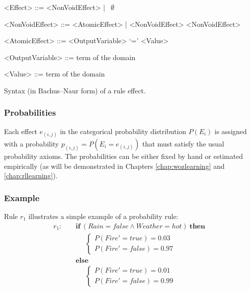 \begin{table}[h]
\vspace{3mm}
\begin{grammar}

<Effect> ::= <NonVoidEffect> | \ $\emptyset$

<NonVoidEffect> ::= <AtomicEffect> | <NonVoidEffect> \lit{$\land$} <NonVoidEffect> 

<AtomicEffect> ::= <OutputVariable> `=' <Value>

<OutputVariable> ::= term of the domain

<Value> ::= term  of the domain

\end{grammar}
\caption{Syntax (in Bachus--Naur form) of a rule effect.}
\label{table:syntaxeffects}
\end{table}

\subsubsection*{Probabilities}

Each effect $e_{(i,j)}$ in the categorical probability distribution $P(E_i)$ is assigned with a probability $p_{(i,j)} = P(E_i = e_{(i,j)})$ that must satisfy the usual probability axioms.  The probabilities can be either fixed by hand or estimated empirically (as will be demonstrated in Chapters \ref{chap:wozlearning} and \ref{chap:rllearning}).


\subsubsection*{Example}

Rule $r_1$ illustrates a simple example of a probability rule:
\begin{align*}
r_1: \ \ \ \ \ & \textbf{if} \ (\mathit{Rain}\!=\!\mathit{false} \land \mathit{Weather}\!=\!\mathit{hot}) \ \textbf{then} \\
& \;\;\;\;\;  \begin{cases}
 P(\mathit{Fire}'\!=\!\mathit{true}) = 0.03 \\ 
P(\mathit{Fire}'\!=\!\mathit{false}) = 0.97
\end{cases} \\ 
& \textbf{else} \\
& \;\;\;\;\; \begin{cases}
P(\mathit{Fire}'\!=\!\mathit{true}) = 0.01 \\
P(\mathit{Fire}'\!=\!\mathit{false}) = 0.99
\end{cases} 
\end{align*}

